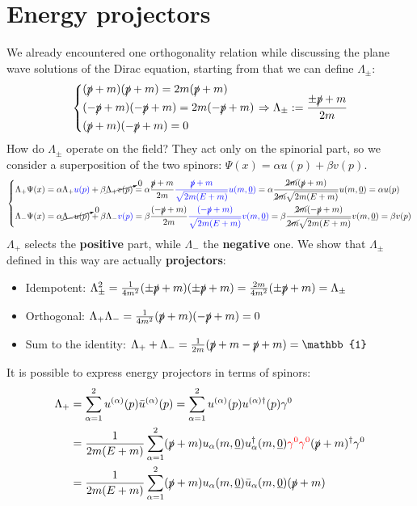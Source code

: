 \documentclass[../main.tex]{subfiles}
\begin{document}
\section{Energy projectors}
We already encountered one orthogonality relation while discussing the plane wave solutions of the Dirac equation, starting from that we can define $\Lambda_\pm$:
\[
\left\{
\begin{aligned}
&(\slashed{p}+m)(\slashed{p}+m)=2m(\slashed{p}+m)\\
&(-\slashed{p}+m)(-\slashed{p}+m)=2m(-\slashed{p}+m)\\
&(\slashed{p}+m)(-\slashed{p}+m)=0
\end{aligned}
\right.
\Rightarrow\Lambda_\pm:=\frac{\pm\slashed{p}+m}{2m}
\]
How do $\Lambda_\pm$ operate on the field? They act only on the spinorial part, so we consider a superposition of the two spinors: $\Psi(x)=\alpha u(p)+\beta v(p)$.
\[
\left\{
\begin{aligned}
\Lambda_+\Psi(x)&=\alpha\Lambda_+{\color{blue}u(p)}+\beta\cancelto{0}{\Lambda_+v(p)}=\alpha\frac{\slashed{p}+m}{2m}{\color{blue}\frac{\slashed{p}+m}{\sqrt{2m(E+m)}}u(m,\underline{0})}=\alpha\frac{\cancel{2m}(\slashed{p}+m)}{\cancel{2m}\sqrt{2m(E+m)}}u(m,\underline{0})=\alpha u(p)\\
\Lambda_-\Psi(x)&=\alpha\cancelto{0}{\Lambda_-u(p)}+\beta\Lambda_-{\color{blue}v(p)}=\beta\frac{(-\slashed{p}+m)}{2m}{\color{blue}\frac{(-\slashed{p}+m)}{\sqrt{2m(E+m)}}v(m,\underline{0})}=\beta\frac{\cancel{2m}(-\slashed{p}+m)}{\cancel{2m}\sqrt{2m(E+m)}}v(m,\underline{0})=\beta v(p)
\end{aligned}
\right.
\]
$\Lambda_+$ selects the \textbf{positive} part, while $\Lambda_-$ the \textbf{negative} one. We show that $\Lambda_\pm$ defined in this way are actually \textbf{projectors}:
\begin{itemize}
    \item Idempotent: $\Lambda^2_\pm=\frac{1}{4m^2}(\pm\slashed{p}+m)(\pm\slashed{p}+m)=\frac{2m}{4m^2}(\pm\slashed{p}+m)=\Lambda_\pm$
    \item Orthogonal: $\Lambda_+\Lambda_-=\frac{1}{4m^2}(\slashed{p}+m)(-\slashed{p}+m)=0$
    \item Sum to the identity: $\Lambda_++\Lambda_-=\frac{1}{2m}(\slashed{p}+m-\slashed{p}+m)=\mathbb{1}$
\end{itemize}
It is possible to express energy projectors in terms of spinors:
\begin{align*}
\Lambda_+&=\sum_{\alpha=1}^2 u^{(\alpha)}(p)\bar{u}^{(\alpha)}(p)=\sum_{\alpha=1}^2 u^{(\alpha)}(p)u^{(\alpha)\dagger}(p)\gamma^0\\
&=\frac{1}{2m(E+m)}\sum_{\alpha=1}^2(\slashed{p}+m)u_\alpha(m,\underline{0}) u^\dagger_\alpha(m,\underline{0}){\color{red}\gamma^0\gamma^0}(\slashed{p}+m)^\dagger\gamma^0\\
&=\frac{1}{2m(E+m)}\sum_{\alpha=1}^2(\slashed{p}+m)u_\alpha(m,\underline{0})\bar{u}_\alpha(m,\underline{0})(\slashed{p}+m)
\end{align*}
\end{document}
